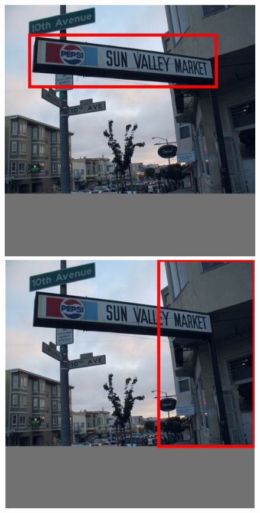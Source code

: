 \begin{figure}[h!]
{\begin{minipage}[t]{3.5cm}
	\end{minipage}
	\begin{minipage}[t]{3.5cm}
		\centering
		\includegraphics[width=0.9\linewidth]{figures/result/street/o3}
	\end{minipage}
		\begin{minipage}[t]{3.5cm}
			\centering
			\includegraphics[width=0.9\linewidth]{figures/result/street/o4}
	\end{minipage}}
	

\end{figure}
